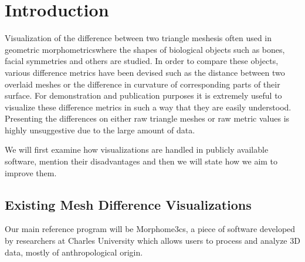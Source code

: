 \chapter*{Introduction}

Visualization of the difference between two triangle meshes\footnotemark is often used in geometric morphometrics\footnotemark where the shapes of biological objects such as bones, facial symmetries and others are studied. In order to compare these objects, various difference metrics have been devised such as the distance between two overlaid meshes or the difference in curvature of corresponding parts of their surface. For demonstration and publication purposes it is extremely useful to visualize these difference metrics in such a way that they are easily understood. Presenting the differences on either raw triangle meshes or raw metric values is highly unsuggestive due to the large amount of data\footnotemark.

\addtocounter{footnote}{-3}

We will first examine how visualizations are handled in publicly available software, mention their disadvantages and then we will state how we aim to improve them.

\section*{Existing Mesh Difference Visualizations}
\label{sec:existing_visualizations}

Our main reference program will be Morphome3cs\footnotemark, a piece of software developed by researchers at Charles University which allows users to process and analyze 3D data, mostly of anthropological origin.


